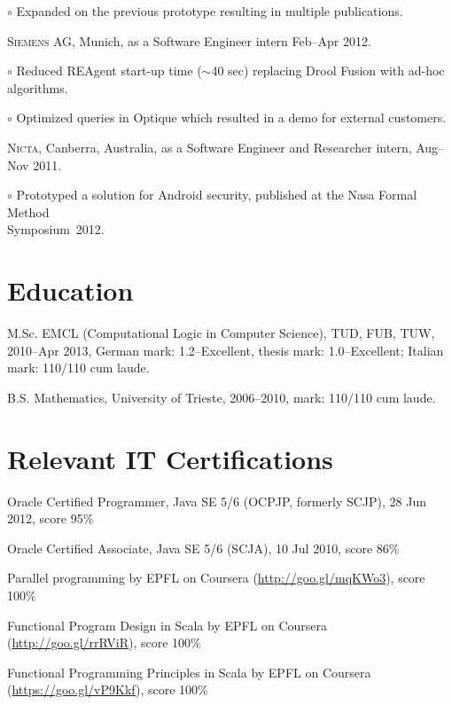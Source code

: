 \documentclass[letterpaper]{article}
\renewenvironment{itemize}{
  \begin{list}{}{
    \setlength{\leftmargin}{1.5em}
  }
}{
  \end{list}
}
\newenvironment{no-indent-itemize}{
  \begin{list}{}{
    \setlength{\leftmargin}{0em}
  }
}{
  \end{list}
}
\def\tilde{$\scriptstyle\sim$}
\def\bullet{$\circ$\xspace}
\begin{document}
\begin{no-indent-itemize}
\begin{itemize}
	\item\bullet Expanded on the previous prototype resulting in multiple publications.
  \end{itemize}
  \item \textsc{Siemens AG}, Munich, as a Software Engineer intern Feb--Apr 2012.
  \begin{itemize}
    \item\bullet Reduced REAgent start-up time (\tilde 40 sec) replacing Drool Fusion with 
          ad-hoc algorithms.
    \item\bullet Optimized queries in Optique which resulted in a demo for external customers.
  \end{itemize}
  \item \textsc{Nicta}, Canberra, Australia, as a Software Engineer and Researcher intern, Aug--Nov 2011. 
  \begin{itemize}
	\item\bullet Prototyped a solution for Android security, published at the Nasa Formal Method \\
	\phantom{\bullet }Symposium~2012.
  \end{itemize}
\end{no-indent-itemize}

\section*{Education}
\begin{no-indent-itemize}
  \item M.Sc. EMCL (Computational Logic in Computer Science), TUD, FUB, TUW, 2010--Apr 2013, 
        German mark: 1.2--Excellent, thesis mark: 1.0--Excellent; Italian mark: 110/110 cum laude.
  \item B.S. Mathematics, University of Trieste, 2006--2010, mark: 110/110 cum laude. 
\end{no-indent-itemize}

\section*{Relevant IT Certifications}
\begin{no-indent-itemize}
  \item Oracle Certified Programmer, Java SE 5/6 (OCPJP, formerly SCJP), 28 Jun 2012, score 95\%
  \item Oracle Certified Associate, Java SE 5/6 (SCJA), 10 Jul 2010, score 86\%
  \item Parallel programming by EPFL on Coursera 
        (\href{http://goo.gl/mqKWo3}{http://goo.gl/mqKWo3}), score 100\%
  \item Functional Program Design in Scala by EPFL on Coursera 
        (\href{https://goo.gl/vP9Kkf}{http://goo.gl/rrRViR}), score 100\%
  \item Functional Programming Principles in Scala by EPFL on Coursera 
        (\href{https://goo.gl/vP9Kkf}{https://goo.gl/vP9Kkf}), score 100\%
\end{no-indent-itemize}
\end{document}
